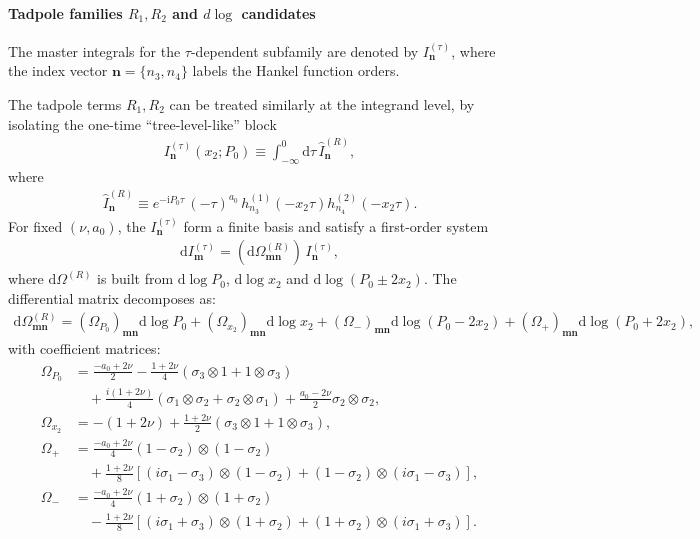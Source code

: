 \documentclass[a4paper,12pt]{article}
\newcommand{\n}{\nonumber}
\def\di{{\mathrm{d}}}
\def\ii{\mathrm{i}}
\begin{document}
\paragraph{Tadpole families $R_1,R_2$ and $d\log$ candidates}
The master integrals for the $\tau$-dependent subfamily are denoted by $I^{(\tau)}_{\bm n}$, where the index vector $\bm n=\{n_3,n_4\}$ labels the Hankel function orders.

The tadpole terms $R_1,R_2$ can be treated similarly at the integrand level, by isolating the one-time ``tree-level-like'' block
\begin{align}
	I^{(\tau)}_{\bm n}(x_2;P_0)\equiv \int_{-\infty}^0 \di\tau\,\hat{I}^{(R)}_{\bm n},
\end{align}
where
\begin{align}
	\hat{I}^{(R)}_{\bm n} \equiv e^{-\ii P_0\tau}\,(-\tau)^{a_0}\,h_{n_3}^{(1)}(-x_2\tau)h_{n_4}^{(2)}(-x_2\tau).
\end{align}
For fixed $(\nu,a_0)$, the $I^{(\tau)}_{\bm n}$ form a finite basis and satisfy a first-order system
\begin{align}
	\di I^{(\tau)}_{\bm m}=\left(\di\Omega^{(R)}_{\bm m\bm n}\right)\,I^{(\tau)}_{\bm n},
\end{align}
where $\di\Omega^{(R)}$ is built from $\di\log P_0$, $\di\log x_2$ and $\di\log(P_0\pm 2x_2)$.
The differential matrix decomposes as:
\begin{align}
	\di\Omega^{(R)}_{\bm m\bm n} = \left(\Omega_{P_0}\right)_{\bm m\bm n} \di\log P_0 + \left(\Omega_{x_2}\right)_{\bm m\bm n} \di\log x_2 + \left(\Omega_{-}\right)_{\bm m\bm n} \di\log\left(P_0-2x_2\right) + \left(\Omega_{+}\right)_{\bm m\bm n} \di\log\left(P_0+2x_2\right),
\end{align}
with coefficient matrices:
\begin{align}
	\Omega_{P_0} &= \frac{-a_0+2\nu}{2} 
	- \frac{1+2\nu}{4} (\sigma_3 \otimes 1 + 1 \otimes \sigma_3) \n\\
	&\quad + \frac{i(1+2\nu)}{4} (\sigma_1 \otimes \sigma_2 + \sigma_2 \otimes \sigma_1)
	+ \frac{a_0-2\nu}{2} \sigma_2 \otimes \sigma_2, \\
	\Omega_{x_2} &= -(1+2\nu) + \frac{1+2\nu}{2}(\sigma_3\otimes 1 + 1\otimes \sigma_3), \\
	\Omega_{+} &= \frac{-a_0+2\nu}{4}(1-\sigma_2)\otimes(1-\sigma_2) \n\\
	&\quad + \frac{1+2\nu}{8}\left[ (i\sigma_1-\sigma_3)\otimes(1-\sigma_2) + (1-\sigma_2)\otimes(i\sigma_1-\sigma_3) \right], \\
	\Omega_{-} &= \frac{-a_0+2\nu}{4}(1+\sigma_2)\otimes(1+\sigma_2) \n\\
	&\quad - \frac{1+2\nu}{8}\left[ (i\sigma_1+\sigma_3)\otimes(1+\sigma_2) + (1+\sigma_2)\otimes(i\sigma_1+\sigma_3) \right].
\end{align}
\end{document}
